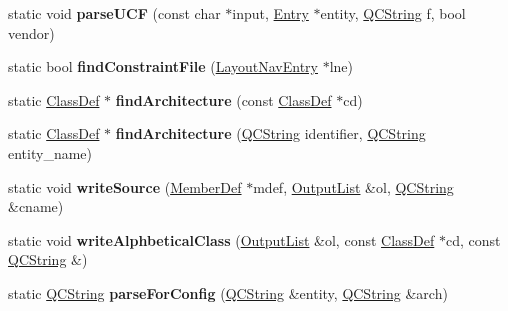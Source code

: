 \begin{DoxyCompactItemize}
static void {\bfseries parse\+U\+CF} (const char $\ast$input, \mbox{\hyperlink{class_entry}{Entry}} $\ast$entity, \mbox{\hyperlink{class_q_c_string}{Q\+C\+String}} f, bool vendor)
\item 
\mbox{\label{class_vhdl_doc_gen_a8879c8899b889e4c595e128841054861}} 
static bool {\bfseries find\+Constraint\+File} (\mbox{\hyperlink{struct_layout_nav_entry}{Layout\+Nav\+Entry}} $\ast$lne)
\item 
\mbox{\label{class_vhdl_doc_gen_a85060afa6fb3a871770412d06d445f62}} 
static \mbox{\hyperlink{class_class_def}{Class\+Def}} $\ast$ {\bfseries find\+Architecture} (const \mbox{\hyperlink{class_class_def}{Class\+Def}} $\ast$cd)
\item 
\mbox{\label{class_vhdl_doc_gen_adb468ffc3a78f01a58bd6ca92dcc10ec}} 
static \mbox{\hyperlink{class_class_def}{Class\+Def}} $\ast$ {\bfseries find\+Architecture} (\mbox{\hyperlink{class_q_c_string}{Q\+C\+String}} identifier, \mbox{\hyperlink{class_q_c_string}{Q\+C\+String}} entity\+\_\+name)
\item 
\mbox{\label{class_vhdl_doc_gen_ae08bfd74e8450f8abc4fb3a265d6b24a}} 
static void {\bfseries write\+Source} (\mbox{\hyperlink{class_member_def}{Member\+Def}} $\ast$mdef, \mbox{\hyperlink{class_output_list}{Output\+List}} \&ol, \mbox{\hyperlink{class_q_c_string}{Q\+C\+String}} \&cname)
\item 
\mbox{\label{class_vhdl_doc_gen_a62637da4d5b53a0243289ac6a4af2011}} 
static void {\bfseries write\+Alphbetical\+Class} (\mbox{\hyperlink{class_output_list}{Output\+List}} \&ol, const \mbox{\hyperlink{class_class_def}{Class\+Def}} $\ast$cd, const \mbox{\hyperlink{class_q_c_string}{Q\+C\+String}} \&)
\item 
\mbox{\label{class_vhdl_doc_gen_a4584e2262b81979f6d9b88c070c78753}} 
static \mbox{\hyperlink{class_q_c_string}{Q\+C\+String}} {\bfseries parse\+For\+Config} (\mbox{\hyperlink{class_q_c_string}{Q\+C\+String}} \&entity, \mbox{\hyperlink{class_q_c_string}{Q\+C\+String}} \&arch)
\item 
\mbox{\label{class_vhdl_doc_gen_a411f4f042964d6e24c0376f1378da1a8}} 

\end{DoxyCompactItemize}
